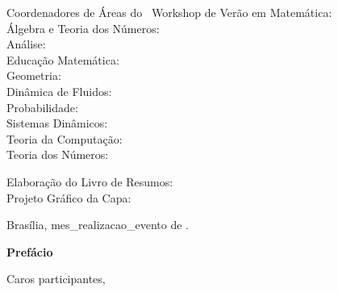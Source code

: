 \begin{flushleft}
		\noindent Coordenadores de \'{A}reas do \edworkshop\ Workshop de Ver\~{a}o em Matem\'{a}tica: \\
		\noindent \'{A}lgebra e Teoria dos N\'{u}meros: \coordalgebratn \\
		\noindent An\'{a}lise: \coordanalise \\
		\noindent Educa\c{c}\~{a}o Matem\'{a}tica: \coordedumat\\
		\noindent Geometria: \coordgeometria \\
		\noindent Dinâmica de Fluidos: \coorddinflui \\
		\noindent Probabilidade: \coordprobab \\
		\noindent Sistemas Din\^{a}micos:  \coordsistdin \\
		\noindent Teoria da Computa\c{c}\~{a}o: \coordteocomp\\
		\noindent Teoria dos N\'{u}meros: \coordteonumeros\\
	\end{flushleft}
	
	\vspace{1.15cm}
	
	\noindent Elabora\c{c}\~{a}o do Livro de Resumos: \livresumos \\
	\noindent Projeto Gr\'{a}fico da Capa: \artcapa
	
	\vspace{1.15cm}
	
	\begin{center}
		Bras\'{i}lia, mes_realizacao_evento de \ano.
	\end{center}
	
	\newpage\clearpage
	
	
	
	

	\begin{center}
	\huge{{\bf Pref\'{a}cio}}
	\vspace{1cm}
	\end{center}

Caros participantes,

\vspace{24pt}

